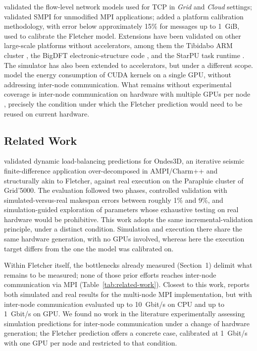 \documentclass[12pt]{article}
\begin{document}
\cite{velho2013tcp} validated the flow-level network models used for TCP in \textit{Grid} and \textit{Cloud} settings; \cite{degomme2017smpi} validated SMPI for unmodified MPI applications; \cite{cornebize2021predictions} added a platform calibration methodology, with error below approximately 15\% for messages up to 1~GiB, used to calibrate the Fletcher model. Extensions have been validated on other large-scale platforms without accelerators, among them the Tibidabo ARM cluster \cite{bedaride2013tibidabo}, the BigDFT electronic-structure code \cite{degomme2017smpi}, and the StarPU task runtime \cite{stanisic2015starpu}. The simulator has also been extended to accelerators, but under a different scope. \cite{boughzala2020simgridgpu} model the energy consumption of CUDA kernels on a single GPU, without addressing inter-node communication. What remains without experimental coverage is inter-node communication on hardware with multiple GPUs per node \cite{unat2026gpucomm}, precisely the condition under which the Fletcher prediction would need to be reused on current hardware.
\subsection{Related Work}
\cite{tesser2017simulation} validated dynamic load-balancing predictions for Ondes3D, an iterative seismic finite-difference application over-decomposed in AMPI/Charm++ and structurally akin to Fletcher, against real execution on the Parapluie cluster of Grid'5000. The evaluation followed two phases, controlled validation with simulated-versus-real makespan errors between roughly 1\% and 9\%, and simulation-guided exploration of parameters whose exhaustive testing on real hardware would be prohibitive. This work adopts the same incremental-validation principle, under a distinct condition. Simulation and execution there share the same hardware generation, with no GPUs involved, whereas here the execution target differs from the one the model was calibrated on.

Within Fletcher itself, the bottlenecks already measured (Section~1) delimit what remains to be measured; none of those prior efforts \cite{rigon2024otimizando,kunas2024enhancing,kunas2025compressao} reaches inter-node communication via MPI (Table~\ref{tab:related-work}). Closest to this work, \cite{spadotto2026sbacpad} reports both simulated and real results for the multi-node MPI implementation, but with inter-node communication evaluated up to 10~Gbit/s on CPU and up to 1~Gbit/s on GPU. We found no work in the literature experimentally assessing simulation predictions for inter-node communication under a change of hardware generation; the Fletcher prediction offers a concrete case, calibrated at 1~Gbit/s with one GPU per node and restricted to that condition.
\end{document}
